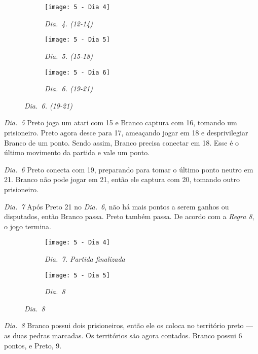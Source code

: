 \begin{figure}[h!]
  \centering
  \begin{subfigure}[t]{.3\textwidth}
      \centering
      \texttt{[image: 5 - Dia 4]}
      \caption*{\emph{Dia.\@~4. (12-14)}}
  \end{subfigure}
  \hfill
  \begin{subfigure}[t]{.3\textwidth}
      \centering
      \texttt{[image: 5 - Dia 5]}
      \caption*{\emph{Dia.\@~5. (15-18)}}
  \end{subfigure}
  \hfill
  \begin{subfigure}[t]{.3\textwidth}
      \centering
      \texttt{[image: 5 - Dia 6]}
      \caption*{\emph{Dia.\@~6. (19-21)}}
  \end{subfigure}
\end{figure}

\emph{Dia.\@~5} Preto joga um atari com 15 e Branco captura com 16, tomando um prisioneiro. Preto agora desce para 17, ameaçando jogar em 18 e desprivilegiar Branco de um ponto. Sendo assim, Branco precisa conectar em 18. Esse é o último movimento da partida e vale um ponto.

\emph{Dia.\@~6} Preto conecta com 19, preparando para tomar o último ponto neutro em 21. Branco não pode jogar em 21, então ele captura com 20, tomando outro prisioneiro.

\emph{Dia.\@~7} Após Preto 21 no \emph{Dia.\@~6}, não há mais pontos a serem ganhos ou disputados, então Branco passa. Preto também passa. De acordo com a \emph{Regra 8}, o jogo termina.

\begin{figure}[h!]
  \centering
  \begin{subfigure}[t]{.3\textwidth}
      \centering
      \texttt{[image: 5 - Dia 4]}
      \caption*{\emph{Dia.\@~7. Partida finalizada}}
  \end{subfigure}
  \hspace{1cm}
  \begin{subfigure}[t]{.3\textwidth}
      \centering
      \texttt{[image: 5 - Dia 5]}
      \caption*{\emph{Dia.\@~8}}
  \end{subfigure}
\end{figure}

\emph{Dia.\@~8} Branco possui dois prisioneiros, então ele os coloca no território preto --- as duas pedras marcadas. Os territórios são agora contados. Branco possui 6 pontos, e Preto, 9.

